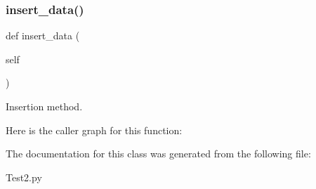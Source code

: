 \subsubsection{\texorpdfstring{insert\+\_\+data()}{insert\_data()}}
{\footnotesize\ttfamily def insert\+\_\+data (\begin{DoxyParamCaption}\item[{}]{self }\end{DoxyParamCaption})}



Insertion method. 

Here is the caller graph for this function\+:


The documentation for this class was generated from the following file\+:\begin{DoxyCompactItemize}
\item 
Test2.\+py\end{DoxyCompactItemize}
